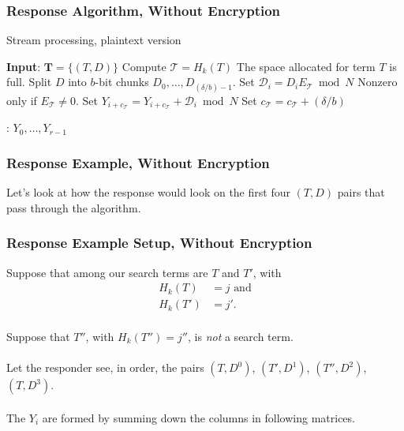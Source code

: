 \documentclass{beamer}
\makeatletter
\DeclareRobustCommand*{\&}{%
  \nfss@text{%
    \fontfamily{LinuxBiolinumT-TLF}%
    \selectfont
    \symbol{`\&}%
  }%
}
\makeatother
\begin{document}
\begin{frame}
  \frametitle{Response Algorithm, Without Encryption}
  \begin{algorithm}[H]
  \caption{Stream processing, plaintext version}\label{alg.plain_stream}
\begin{algorithmic}[1]
\State \textbf{Input}:  $\mathbf{T} = \{ (T,D) \}$
  \State Compute \(\mathcal{T} = H_{k}(T)\)
  \label{step.if}
  \Comment The space allocated for term \(T\) is full.
  \State \Return \label{step.return}
\Else
  \State Split \(D\) into \(b\)-bit chunks
  \(D_{0},\ldots,D_{(\delta/b)-1}\).
  \State\label{step.multiply}Set \(\mathcal{D}_{i} = D_{i}E_{\mathcal{T}}\bmod N\)
  \Comment Nonzero only if \(E_{\mathcal{T}}\neq 0\).
  \State Set \(Y_{i+c_{\mathcal{T}}} =
  Y_{i+c_{\mathcal{T}}}+\mathcal{D}_{i}\bmod N\)
  \EndFor
  \State Set \(c_{\mathcal{T}} = c_{\mathcal{T}}+(\delta/b)\)
\EndIf

\EndFor
{}: \(Y_{0},\ldots,Y_{r-1}\)
\end{algorithmic}
\end{algorithm}
\end{frame}

\begin{frame}
  \frametitle{Response Example, Without Encryption}
  Let's look at how the response would look on the first four $(T,D)$ pairs that
  pass through the algorithm.
\end{frame}

\begin{frame}
  \frametitle{Response Example Setup, Without Encryption}
  Suppose that among our search terms are $T$ and $T'$, with 
  \begin{align*}
    H_k(T) &= j\text{ and}\\
    H_k(T') &= j'.
  \end{align*}~\\

  
  Suppose that $T''$, with $H_k(T'')=j''$, is \emph{not} a search term.\\~\\

  Let the responder see, in order, the pairs $(T, D^0)$, $(T', D^1)$,
  $(T'', D^2)$, $(T, D^3)$.\\~\\

  The $Y_i$ are formed by summing down the columns in following matrices.
\end{frame}
\end{document}
